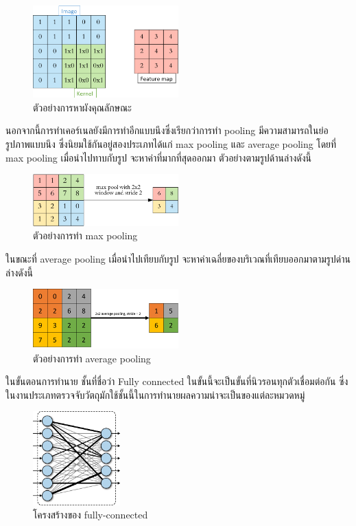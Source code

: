  \begin{figure}[!ht]
	\centering
	\includegraphics[width=0.5\textwidth]{chapter2/images/feature_map.png}
		\caption{ตัวอย่างการหาผังคุณลักษณะ }
    	\label{fig:example feature map}
\end{figure}

นอกจากนี้การทำเคอร์เนลยังมีการทำอีกแบบนึงซึ่งเรียกว่าการทำ pooling มีความสามารถในย่อรูปภาพแบบนึง ซึ่งนิยมใช้กันอยู่สองประเภทได้แก่ max pooling และ average pooling
โดยที่ max pooling เมื่อนำไปทาบกับรูป จะหาค่าที่มากที่สุดออกมา ตัวอย่างตามรูปด้านล่างดังนี้

 \begin{figure}[!ht]
	\centering
	\includegraphics[width=0.5\textwidth]{chapter2/images/max_pooling.png}
		\caption{ตัวอย่างการทำ max pooling }
    	\label{fig:example max pooling}
\end{figure} 

ในขณะที่ average pooling เมื่อนำไปเทียบกับรูป จะหาค่าเฉลี่ยของบริเวณที่เทียบออกมาตามรูปด่านล่างดังนี้

 \begin{figure}[!ht]
	\centering
	\includegraphics[width=0.5\textwidth]{chapter2/images/average_pooling.png}
		\caption{ตัวอย่างการทำ average pooling }
    	\label{fig:example average pooling}
\end{figure}
\clearpage
ในขั้นตอนการทำนาย ชั้นที่ชื่อว่า Fully connected ในขั้นนี้จะเป็นขั้นที่นิวรอนทุกตัวเชื่อมต่อกัน ซึ่งในงานประเภทตรวจจับวัตถุมักใช้ชั้นนี้ในการทำนายผลความน่าจะเป็นของแต่ละหมวดหมู่ 
 \begin{figure}[!ht]
	\centering
	\includegraphics[width=0.3\textwidth]{chapter2/images/fully-connected.png}
		\caption{โครงสร้างของ fully-connected}
    	\label{fig:fully-connected}
\end{figure}


